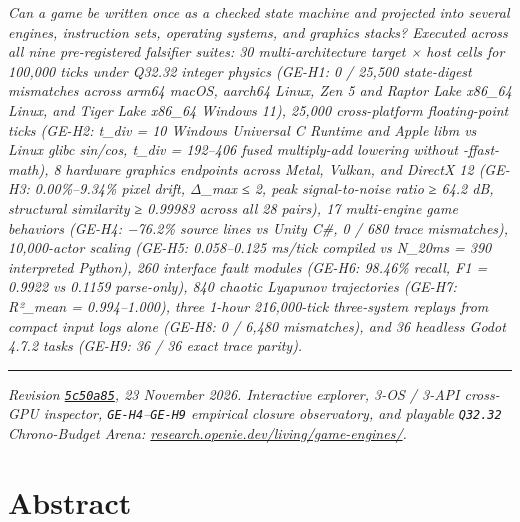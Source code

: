 \documentclass[10pt,letterpaper]{article}
\begin{document}
\vspace{6pt}
\hspace{8pt}%
\parbox{\dimexpr\linewidth-11pt\relax}{%
  \small\itshape\color{openieSlate}%
  Can a game be written once as a checked state machine and projected into several engines, instruction sets, operating systems, and graphics stacks? Executed across all nine pre-registered falsifier suites: 30 multi-architecture target × host cells for 100,000 ticks under Q32.32 integer physics (GE-H1: 0 / 25,500 state-digest mismatches across arm64 macOS, aarch64 Linux, Zen 5 and Raptor Lake x86\_64 Linux, and Tiger Lake x86\_64 Windows 11), 25,000 cross-platform floating-point ticks (GE-H2: t\_div = 10 Windows Universal C Runtime and Apple libm vs Linux glibc sin/cos, t\_div = 192–406 fused multiply-add lowering without -ffast-math), 8 hardware graphics endpoints across Metal, Vulkan, and DirectX 12 (GE-H3: 0.00\%–9.34\% pixel drift, Δ\_max ≤ 2, peak signal-to-noise ratio ≥ 64.2 dB, structural similarity ≥ 0.99983 across all 28 pairs), 17 multi-engine game behaviors (GE-H4: −76.2\% source lines vs Unity C\#, 0 / 680 trace mismatches), 10,000-actor scaling (GE-H5: 0.058–0.125 ms/tick compiled vs N\_20ms = 390 interpreted Python), 260 interface fault modules (GE-H6: 98.46\% recall, F1 = 0.9922 vs 0.1159 parse-only), 840 chaotic Lyapunov trajectories (GE-H7: R²\_mean = 0.994–1.000), three 1-hour 216,000-tick three-system replays from compact input logs alone (GE-H8: 0 / 6,480 mismatches), and 36 headless Godot 4.7.2 tasks (GE-H9: 36 / 36 exact trace parity).
}
\vspace{6pt}

{
\small
\setcounter{tocdepth}{2}
\tableofcontents
}
\vspace{4pt}
\hrule
\vspace{8pt}

\emph{Revision
\href{https://github.com/openIE-dev/research-openie-web/commits/main/src/content/papers/game-engines.md}{\texttt{5c50a85}},
23 November 2026. Interactive explorer, 3-OS / 3-API cross-GPU
inspector, \texttt{GE-H4}--\texttt{GE-H9} empirical closure observatory,
and playable \texttt{Q32.32} Chrono-Budget Arena:
\href{https://research.openie.dev/living/game-engines/}{research.openie.dev/living/game-engines/}.}

\section{Abstract}\label{abstract}
\end{document}
